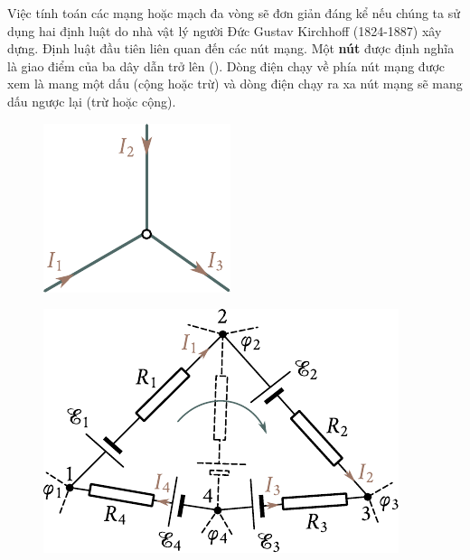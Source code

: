 Việc tính toán các mạng hoặc mạch đa vòng sẽ đơn giản đáng kể nếu chúng ta sử dụng hai định luật do nhà vật lý người Đức Gustav Kirchhoff (1824-1887) xây dựng. Định luật đầu tiên liên quan đến các nút mạng. Một \textbf{nút} được định nghĩa là giao điểm của ba dây dẫn trở lên (). Dòng điện chạy về phía nút mạng được xem là mang một dấu (cộng hoặc trừ) và dòng điện chạy ra xa nút mạng sẽ mang dấu ngược lại (trừ hoặc cộng).


\begin{figure}[!htb]
	\begin{minipage}[t]{0.38\linewidth}
		\begin{center}
			\includegraphics[scale=1]{figures/ch_05/fig_5_7.pdf}
			\caption[]{}
			\label{fig:5_7}
		\end{center}
	\end{minipage}
	\hfill{ }%
	\begin{minipage}[t]{0.58\linewidth}
		\begin{center}
			\includegraphics[scale=1]{figures/ch_05/fig_5_8.pdf}
			\caption[]{}
			\label{fig:5_8}
		\end{center}
	\end{minipage}
\vspace{-0.4cm}
\end{figure}

